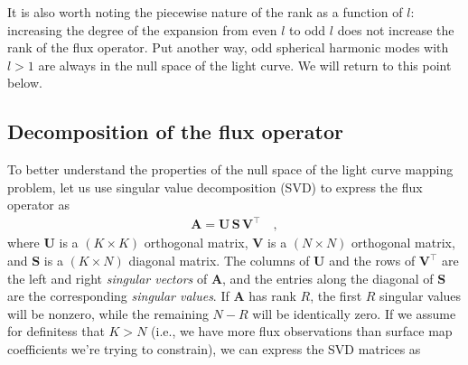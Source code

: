 \documentclass[modern]{aastex62}
\begin{document}
It is also worth noting the piecewise nature of the rank as a function of
$l$: increasing the degree of the expansion from even $l$ to odd $l$ does not
increase the rank of the flux operator. Put another way, odd spherical
harmonic modes with $l > 1$ are always in the null space of the light curve.
We will return to this point below.

\subsection{Decomposition of the flux operator}
%
To better understand the properties of the null space of the light curve
mapping problem, let
%
us use singular value decomposition (SVD) to express
the flux operator as
%
\begin{align}
    \mathbf{A} = \mathbf{U} \, \mathbf{S} \, \mathbf{V}^\top
    \quad,
\end{align}
%
where $\mathbf{U}$ is a $(K \times K)$ orthogonal matrix,
$\mathbf{V}$ is a $(N \times N)$ orthogonal matrix,
and $\mathbf{S}$ is a $(K \times N)$ diagonal matrix.
%
The columns of $\mathbf{U}$ and the rows of $\mathbf{V}^\top$ are the left and right
\emph{singular vectors} of $\mathbf{A}$, and the entries along the
diagonal of $\mathbf{S}$ are the corresponding \emph{singular values}. If $\mathbf{A}$
has rank $R$, the first $R$ singular values will be nonzero, while the
remaining $N - R$ will be identically zero.
If we assume for definitess that $K > N$ (i.e., we have more flux observations
than surface map coefficients we're trying to constrain), we can express the
SVD matrices as
%
\end{document}
